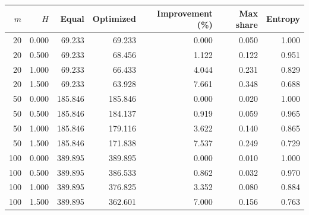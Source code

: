 \begin{tabular}{rrrrrrr}
\toprule
$m$ & $H$ & Equal & Optimized & Improvement (\%) & Max share & Entropy \\
\midrule
20 & 0.000 & 69.233 & 69.233 & 0.000 & 0.050 & 1.000 \\
20 & 0.500 & 69.233 & 68.456 & 1.122 & 0.122 & 0.951 \\
20 & 1.000 & 69.233 & 66.433 & 4.044 & 0.231 & 0.829 \\
20 & 1.500 & 69.233 & 63.928 & 7.661 & 0.348 & 0.688 \\
50 & 0.000 & 185.846 & 185.846 & 0.000 & 0.020 & 1.000 \\
50 & 0.500 & 185.846 & 184.137 & 0.919 & 0.059 & 0.965 \\
50 & 1.000 & 185.846 & 179.116 & 3.622 & 0.140 & 0.865 \\
50 & 1.500 & 185.846 & 171.838 & 7.537 & 0.249 & 0.729 \\
100 & 0.000 & 389.895 & 389.895 & 0.000 & 0.010 & 1.000 \\
100 & 0.500 & 389.895 & 386.533 & 0.862 & 0.032 & 0.970 \\
100 & 1.000 & 389.895 & 376.825 & 3.352 & 0.080 & 0.884 \\
100 & 1.500 & 389.895 & 362.601 & 7.000 & 0.156 & 0.763 \\
\bottomrule
\end{tabular}
